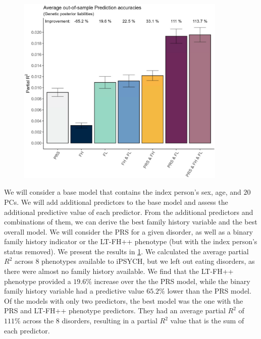 \begin{figure}
	\includegraphics[width=10cm]{results/avg_partial_prediciton_accuracies_noED.png}
	\caption[Average out of sample prediction across $ 8 $ disorders]{}
	\label{fig:paper3:predictionResults}
\end{figure}
We will consider a base model that contains the index person's sex, age, and $ 20 $ PCs. We will add additional predictors to the base 
model and assess the additional predictive value of each predictor. From the additional predictors and combinations of them, we can 
derive the best family history variable and the best overall model. We will consider the PRS for a given disorder, as well as a binary 
family history indicator or the LT-FH++ phenotype (but with the index person's status removed). We present the results in 
\cref{fig:paper3:predictionResults}. We calculated the average partial $ R^2 $ across $ 8 $ phenotypes available to iPSYCH, but we 
left out eating disorders, as there were almost no family history available. We find that the LT-FH++ phenotype provided a $ 19.6\% $ 
increase over the the PRS model, while the binary family history variable had a predictive value $ 65.2\% $ lower than the PRS model. 
Of the models with only two predictors, the best model was the one with the PRS and LT-FH++ phenotype predictors. They had an average 
partial $ R^2 $ of $ 111\% $ across the $ 8 $ disorders, resulting in a partial $ R^2 $ value that is the sum of each predictor. 


